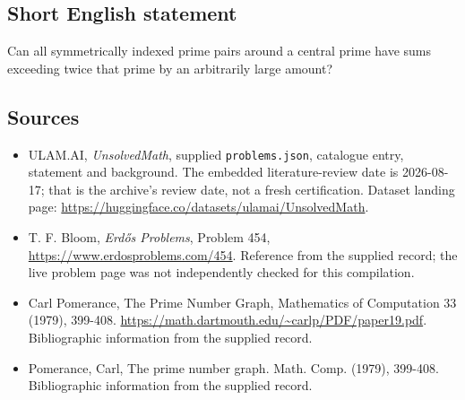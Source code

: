 \documentclass[11pt,a4paper]{article}
\begin{document}
\subsection{Short English statement}

Can all symmetrically indexed prime pairs around a central prime have sums exceeding twice that prime by an arbitrarily large amount?

\subsection{Sources}

{\small

\begin{itemize}

\item[\hypertarget{source:statement:1}{S1}] ULAM.AI, \emph{UnsolvedMath}, supplied \texttt{problems.json}, catalogue entry, statement and background. The embedded literature-review date is 2026-08-17; that is the archive’s review date, not a fresh certification. Dataset landing page: \url{https://huggingface.co/datasets/ulamai/UnsolvedMath}.

\item[\hypertarget{source:statement:2}{S2}] T. F. Bloom, \emph{Erdős Problems}, Problem 454, \url{https://www.erdosproblems.com/454}. Reference from the supplied record; the live problem page was not independently checked for this compilation.

\item[\hypertarget{source:statement:3}{S3}] Carl Pomerance, The Prime Number Graph, Mathematics of Computation 33 (1979), 399-408. \url{https://math.dartmouth.edu/~carlp/PDF/paper19.pdf}. Bibliographic information from the supplied record.

\item[\hypertarget{source:statement:4}{S4}] Pomerance, Carl, The prime number graph. Math. Comp. (1979), 399-408. Bibliographic information from the supplied record.

\end{itemize}

}

\label{end:statement}
\end{document}
